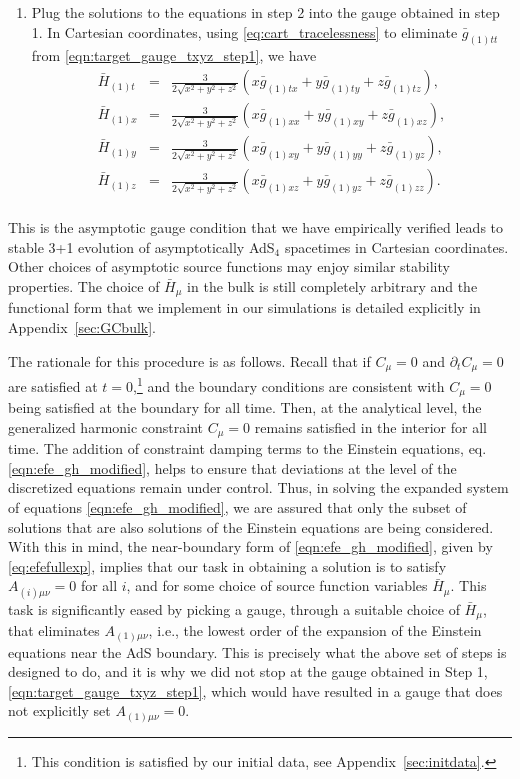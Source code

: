 \documentclass[aps,letterpaper,twocolumn,nofootinbib]{revtex4}
\numberwithin{equation}{section}
\begin{document}
\begin{enumerate}
\item Plug the solutions to the equations in step 2 into the gauge obtained in step 1.
In Cartesian coordinates, using \eqref{eq:cart_tracelessness} to eliminate $\bar{g}_{(1)tt}$ from \eqref{eqn:target_gauge_txyz_step1}, we have
\begin{eqnarray}\label{eqn:target_gauge_txyz}
\bar{H}_{(1)t}&=&\frac{3}{2\sqrt{x^2+y^2+z^2}}(x \bar{g}_{(1)tx}+y\bar{g}_{(1)ty}+z\bar{g}_{(1)tz}),\nonumber\\
\bar{H}_{(1)x}&=&\frac{3}{2\sqrt{x^2+y^2+z^2}}(x \bar{g}_{(1)xx}+y\bar{g}_{(1)xy}+z\bar{g}_{(1)xz}), \nonumber \\
\bar{H}_{(1)y}&=&\frac{3}{2\sqrt{x^2+y^2+z^2}}(x \bar{g}_{(1)xy}+y\bar{g}_{(1)yy}+z\bar{g}_{(1)yz}), \nonumber \\
\bar{H}_{(1)z}&=&\frac{3}{2\sqrt{x^2+y^2+z^2}}(x \bar{g}_{(1)xz}+y\bar{g}_{(1)yz}+z\bar{g}_{(1)zz}). \nonumber \\
\end{eqnarray}
\end{enumerate}
This is the asymptotic gauge condition that we have empirically verified leads to stable 3+1 evolution of asymptotically AdS$_4$ spacetimes in Cartesian coordinates.
Other choices of asymptotic source functions may enjoy similar stability properties.
The choice of $\bar{H}_\mu$ in the bulk is still completely arbitrary and the functional form that we implement in our simulations is detailed explicitly in Appendix~\ref{sec:GCbulk}.

The rationale for this procedure is as follows.
Recall that if $C_\mu=0$ and $\partial_t C_\mu=0$ are satisfied at $t=0$,\footnote{This condition is satisfied by our initial data, see Appendix~\ref{sec:initdata}.} and the boundary conditions are consistent with $C_\mu=0$ being satisfied at the boundary for all time. Then, at the analytical level, the generalized harmonic constraint $C_\mu=0$ remains satisfied in the interior for all time. 
The addition of constraint damping terms to the Einstein equations, eq. \eqref{eqn:efe_gh_modified}, helps to ensure that deviations at the level of the discretized equations remain under control. 
Thus, in solving the expanded system of equations \eqref{eqn:efe_gh_modified}, we are assured that only the subset of solutions that are also solutions of the Einstein equations are being considered.
With this in mind, the near-boundary form of \eqref{eqn:efe_gh_modified}, given by \eqref{eq:efefullexp}, implies that our task in obtaining a solution is to satisfy $A_{(i)\mu\nu}=0$ for all $i$, and for some choice of source function variables $\bar{H}_\mu$. 
This task is significantly eased by picking a gauge, through a suitable choice of $\bar{H}_\mu$, that eliminates $A_{(1)\mu\nu}$, i.e., the lowest order of the expansion of the Einstein equations near the AdS boundary.
This is precisely what the above set of steps is designed to do, and it is why we did not stop at the gauge obtained in Step 1, \eqref{eqn:target_gauge_txyz_step1}, which would have resulted in a gauge that does not explicitly set $A_{(1)\mu\nu}=0$. 
\end{document}

